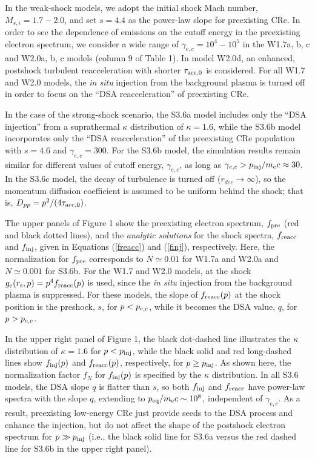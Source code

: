 \documentclass[twocolumn]{aastex61}
\begin{document}
In the weak-shock models, we adopt the initial shock Mach number, $M_{s,i}=1.7-2.0$, and
set $s=4.4$ as the power-law slope for preexisting CRe.
In order to see the dependence of emissions on the cutoff energy in the preexisting electron spectrum, 
we consider a wide range of $\gamma_{e,c}= 10^4-10^5$ 
in the W1.7a, b, c and W2.0a, b, c models (column 9 of Table 1).
In model W2.0d, an enhanced, postshock turbulent reacceleration with shorter $\tau_{\rm acc,0}$ is considered.
For all W1.7 and W2.0 models, the {\it in situ} injection from the background plasma is turned off 
in order to focus on the ``DSA reacceleration'' of preexisting CRe.

In the case of the strong-shock scenario,
the S3.6a model includes only the ``DSA injection'' from a suprathermal 
$\kappa$ distribution of $\kappa=1.6$,
while the S3.6b model incorporates only the ``DSA reacceleration'' of 
the preexisting CRe population with $s=4.6$ and $\gamma_{e,c}= 300$.
For the S3.6b model, the simulation results remain similar for different values of cutoff energy, $\gamma_{e,c}$, as long as 
$\gamma_{e,c}>p_{\rm inj}/m_{\rm e}c\approx 30$.
In the S3.6c model, the decay of turbulence is turned off ($r_{dec}\rightarrow\infty$), 
so the momentum diffusion coefficient is assumed to be uniform behind the shock; that is,
$D_{pp} = p^2/ (4\tau_{\rm acc,0})$.

The upper panels of Figure 1 show the preexisting electron spectrum, $f_{\rm pre}$ (red and black dotted lines), and the
{\it analytic solutions} for the shock spectra, $f_{\rm reacc}$ and $f_{\rm inj}$, given in Equations (\ref{freacc}) and (\ref{finj}), respectively.
Here, the normalization for $f_{\rm pre}$ corresponds to $N \simeq 0.01$ for W1.7a and W2.0a and $N \simeq 0.001$ for S3.6b.
For the W1.7 and W2.0 models, at the shock $g_{\rm e}(r_{\rm s},p)= p^4 f_{\rm reacc}(p)$ is used, 
since the {\it in situ} injection from the background plasma is suppressed. 
For these models, the slope of $f_{\rm reacc}(p)$ at the shock position is the preshock, $s$, for $p<p_{\rm e,c}$, 
while it becomes the DSA value, $q$, for $p> p_{\rm e,c}$.

In the upper right panel of Figure 1,
the black dot-dashed line illustrates the $\kappa$ distribution of $\kappa=1.6$ for $p<p_{\rm inj}$,
while the black solid and red long-dashed lines show $f_{\rm inj}(p)$ and $f_{\rm reacc}(p)$, respectively,
for $p\ge p_{\rm inj}$.
As shown here, the normalization factor $f_N$ for $f_{\rm inj}(p)$ is specified by the $\kappa$ distribution.
In all S3.6 models, the DSA slope $q$ is flatter than $s$,
so both $f_{\rm inj}$ and $f_{\rm reacc}$ have power-law spectra with the slope $q$,
extending to $p_{\rm eq}/m_{\rm e} c \sim 10^8$, independent of $\gamma_{e,c}$.
As a result, preexisting low-energy CRe just provide seeds to the DSA process and enhance the injection,
but do not affect the shape of the postshock electron spectrum for $p\gg p_{\rm inj}$  
(i.e., the black solid line for S3.6a versus the red dashed line for S3.6b in the upper right panel). 
\end{document}

